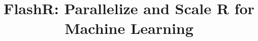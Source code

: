 \documentclass[sigplan,10pt,review,anonymous]{acmart}\settopmatter{printfolios=true}
\begin{document}
\title{FlashR: Parallelize and Scale R for Machine Learning}




\end{document}
